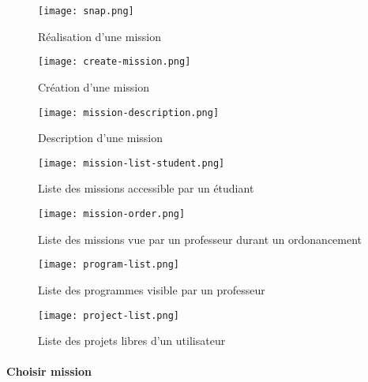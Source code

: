 \begin{figure}
  \begin{center}
    \texttt{[image: snap.png]}
    \caption{Réalisation d'une mission}
    \label{fig:snap-menu}
  \end{center}
\end{figure}
\begin{figure}
  \begin{center}
    \texttt{[image: create-mission.png]}
    \caption{Création d'une mission}
    \label{fig:create-mission}
  \end{center}
\end{figure}
\begin{figure}
  \begin{center}
    \texttt{[image: mission-description.png]}
    \caption{Description d'une mission}
    \label{fig:mission-description}
  \end{center}
\end{figure}
\begin{figure}
  \begin{center}
    \texttt{[image: mission-list-student.png]}
    \caption{Liste des missions accessible par un étudiant}
    \label{fig:mission-list-student}
  \end{center}
\end{figure}
\begin{figure}
  \begin{center}
    \texttt{[image: mission-order.png]}
    \caption{Liste des missions vue par un professeur durant un ordonancement}
    \label{fig:mission-order}
  \end{center}
\end{figure}
\begin{figure}
  \begin{center}
    \texttt{[image: program-list.png]}
    \caption{Liste des programmes visible par un professeur}
    \label{fig:program-list}
  \end{center}
\end{figure}
\begin{figure}
  \begin{center}
    \texttt{[image: project-list.png]}
    \caption{Liste des projets libres d'un utilisateur}
    \label{fig:project-list}
  \end{center}
\end{figure}


\paragraph{Choisir mission}

